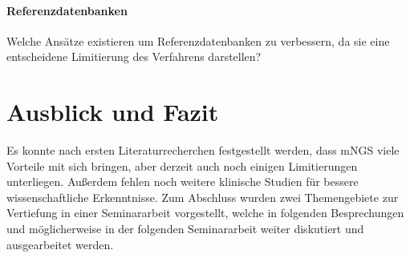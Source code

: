\documentclass[a4paper, conference]{IEEEtran}
\begin{document}
\paragraph{Referenzdatenbanken}
Welche Ansätze existieren um Referenzdatenbanken zu verbessern, da sie eine entscheidene Limitierung des Verfahrens darstellen?

\section{Ausblick und Fazit}
Es konnte nach ersten Literaturrecherchen festgestellt werden, dass mNGS viele Vorteile mit sich bringen, aber derzeit auch noch einigen Limitierungen unterliegen. Außerdem fehlen noch weitere klinische Studien für bessere wissenschaftliche Erkenntnisse. Zum Abschluss wurden zwei Themengebiete zur Vertiefung in einer Seminararbeit vorgestellt, welche in folgenden Besprechungen und möglicherweise in der folgenden Seminararbeit weiter diskutiert und ausgearbeitet werden.




\end{document}
